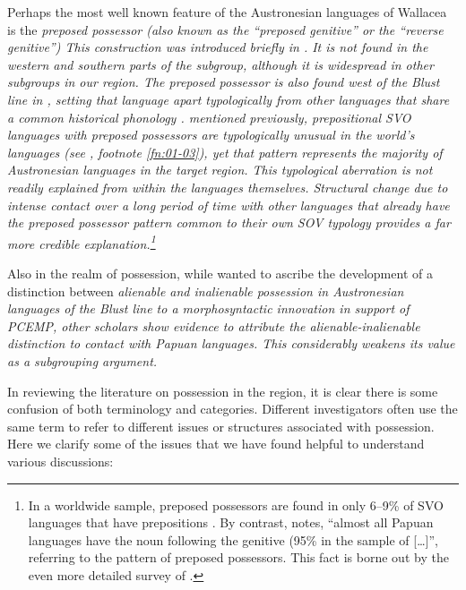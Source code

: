 Perhaps the most well known feature of the Austronesian
languages of Wallacea is the \it{preposed possessor} (also known as the ``preposed genitive''
or the ``reverse genitive'')
This construction was introduced briefly in .
It is not found in the western
and southern parts of the  subgroup,
although it is widespread in other subgroups in our region.
The preposed possessor is also found west of the Blust line in
, setting that language apart typologically from other 
languages that share a common historical phonology \citep[68]{Mead2003b}.
 mentioned previously, prepositional SVO languages with preposed
possessors are typologically unusual in the world’s languages
(see , footnote \ref{fn:01-03}), yet that pattern represents
the majority of Austronesian
languages in the target region.
This typological aberration is not readily explained
from within the languages themselves.
Structural change due to intense contact over a long period of
time with other languages that already have the preposed possessor
pattern common to their own SOV typology provides a far more
credible explanation.\footnote{
		In a worldwide sample,
		preposed possessors are found in only 6--9{\%} of SVO languages
		that have prepositions \citep{Dryer2013a,Dryer2013b,Dryer2013d}.
		By contrast, \citet[118]{Schapper2015} notes, “almost all Papuan languages
		have the noun following the genitive (95{\%} in the sample of
		\citealp{Dryer2013b} [\ldots]”,
		referring to the pattern of preposed possessors.
		This fact is borne out by the even more detailed survey
		of \citet[276--285]{SchapperGasser2023}.}

Also in the realm of possession,
while \citet[259]{Blust1993} wanted to ascribe the development of a
distinction between \it{alienable} and \it{inalienable possession} 
in Austronesian languages  of
the Blust line to a morphosyntactic innovation in support of
PCEMP, other scholars
\citep{KlamerReesinkVanStaden2008,Schapper2015,ReesinkDunn2018,
Klamer2019,SchapperGasser2023,Grimes2024}
show evidence to attribute the alienable-inalienable
distinction to contact with Papuan languages.
This considerably weakens its value as a subgrouping argument.

In reviewing the literature on possession in the region,
it is clear there is some confusion of both terminology and categories.
Different investigators often use the same term to refer to different
issues or structures associated with possession.
Here we clarify some of the issues that we have found helpful
to understand various discussions:

